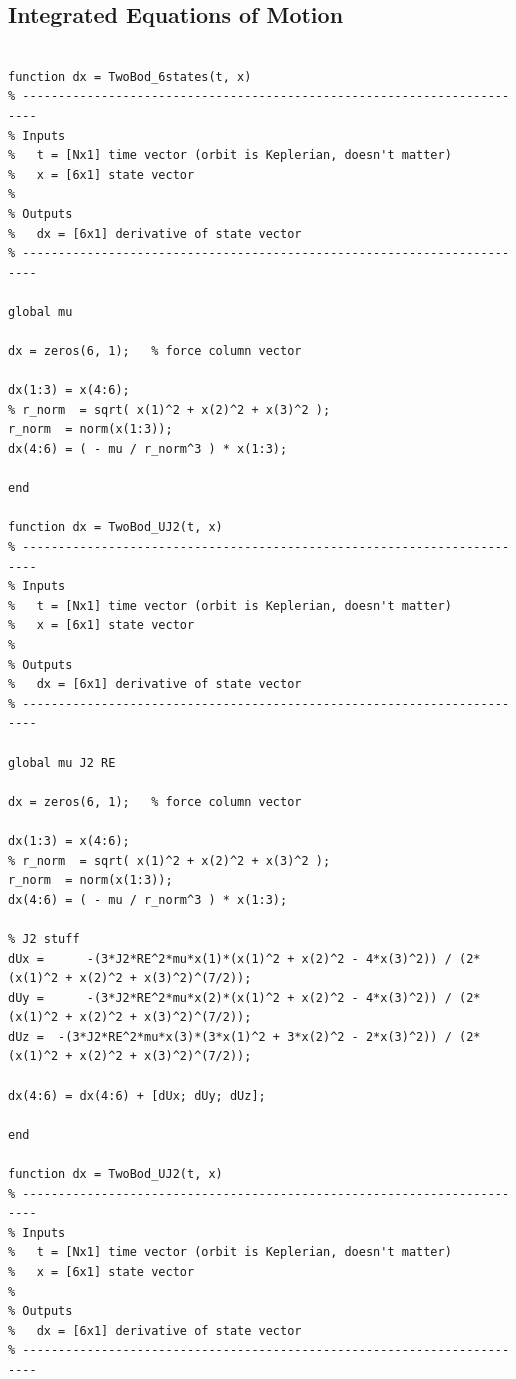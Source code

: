 \documentclass[conf]{new-aiaa}
\begin{document}
\subsection*{Integrated Equations of Motion} 

\begin{lstlisting}

function dx = TwoBod_6states(t, x)
% ------------------------------------------------------------------------
% Inputs 
%   t = [Nx1] time vector (orbit is Keplerian, doesn't matter) 
%   x = [6x1] state vector 
% 
% Outputs 
%   dx = [6x1] derivative of state vector 
% ------------------------------------------------------------------------

global mu 

dx = zeros(6, 1);   % force column vector 

dx(1:3) = x(4:6); 
% r_norm  = sqrt( x(1)^2 + x(2)^2 + x(3)^2 ); 
r_norm  = norm(x(1:3)); 
dx(4:6) = ( - mu / r_norm^3 ) * x(1:3); 

end 

function dx = TwoBod_UJ2(t, x)
% ------------------------------------------------------------------------
% Inputs 
%   t = [Nx1] time vector (orbit is Keplerian, doesn't matter) 
%   x = [6x1] state vector 
% 
% Outputs 
%   dx = [6x1] derivative of state vector 
% ------------------------------------------------------------------------

global mu J2 RE 

dx = zeros(6, 1);   % force column vector 

dx(1:3) = x(4:6); 
% r_norm  = sqrt( x(1)^2 + x(2)^2 + x(3)^2 ); 
r_norm  = norm(x(1:3)); 
dx(4:6) = ( - mu / r_norm^3 ) * x(1:3); 

% J2 stuff 
dUx =      -(3*J2*RE^2*mu*x(1)*(x(1)^2 + x(2)^2 - 4*x(3)^2)) / (2*(x(1)^2 + x(2)^2 + x(3)^2)^(7/2)); 
dUy =      -(3*J2*RE^2*mu*x(2)*(x(1)^2 + x(2)^2 - 4*x(3)^2)) / (2*(x(1)^2 + x(2)^2 + x(3)^2)^(7/2)); 
dUz =  -(3*J2*RE^2*mu*x(3)*(3*x(1)^2 + 3*x(2)^2 - 2*x(3)^2)) / (2*(x(1)^2 + x(2)^2 + x(3)^2)^(7/2)); 

dx(4:6) = dx(4:6) + [dUx; dUy; dUz]; 

end 

function dx = TwoBod_UJ2(t, x)
% ------------------------------------------------------------------------
% Inputs 
%   t = [Nx1] time vector (orbit is Keplerian, doesn't matter) 
%   x = [6x1] state vector 
% 
% Outputs 
%   dx = [6x1] derivative of state vector 
% ------------------------------------------------------------------------


\end{lstlisting}
\end{document}
